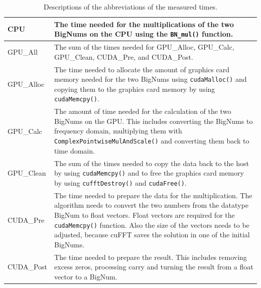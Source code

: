 \documentclass[12pt,a4paper]{article}
\begin{document}
\begin{table}
\centering
\caption{Descriptions of the abbreviations of the measured times.}
\vspace{0.5cm}
\label{Description}
\begin{tabular}{p{2cm}|p{9.0cm}|}
\cline{1-2}
 \multicolumn{1}{|l|}{CPU} & The time needed for the multiplications of the two BigNums on the CPU using the \texttt{BN_mul()} function. \\ \hline
 \multicolumn{1}{|l|}{GPU\_All} & The sum of the times needed for GPU\_Alloc, GPU\_Calc, GPU\_Clean, CUDA\_Pre, and CUDA\_Post. \\ \hline
 \multicolumn{1}{|l|}{GPU\_Alloc} & The time needed to allocate the amount of graphics card memory needed for the two BigNums using \texttt{cudaMalloc()} and copying them to the graphics card memory by using \texttt{cudaMemcpy()}.
 \\ \hline
 \multicolumn{1}{|l|}{GPU\_Calc} & The amount of time needed for the calculation of the two BigNums on the GPU. This includes converting the BigNums to frequency domain, multiplying them with \texttt{ComplexPointwiseMulAndScale()} and converting them back to time domain. \\ \hline
 \multicolumn{1}{|l|}{GPU\_Clean} & The sum of the times needed to copy the data back to the host by using \texttt{cudaMemcpy()} and to free the graphics card memory by using \texttt{cufftDestroy()} and \texttt{cudaFree()}.\\ \hline
 \multicolumn{1}{|l|}{CUDA\_Pre} & The time needed to prepare the data for the multiplication. The algorithm needs to convert the two numbers from the datatype BigNum to float vectors. Float vectors are required for the \texttt{cudaMemcpy()} function. Also the size of the vectors needs to be adjusted, because cuFFT saves the solution in one of the initial BigNums. \\ \hline
 \multicolumn{1}{|l|}{CUDA\_Post} & The time needed to prepare the result. This includes removing excess zeros, processing carry and turning the result from a float vector to a BigNum. \\ \hline
\end{tabular}
\end{table}
\end{document}
